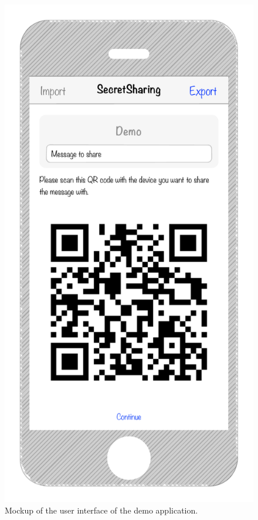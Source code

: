 \begin{figure}[t]
	\centering
	\includegraphics[width=\columnwidth]{figures/mockup.pdf}
	\caption{Mockup of the user interface of the demo application.}%
	\label{fig:mockup}
\end{figure}

